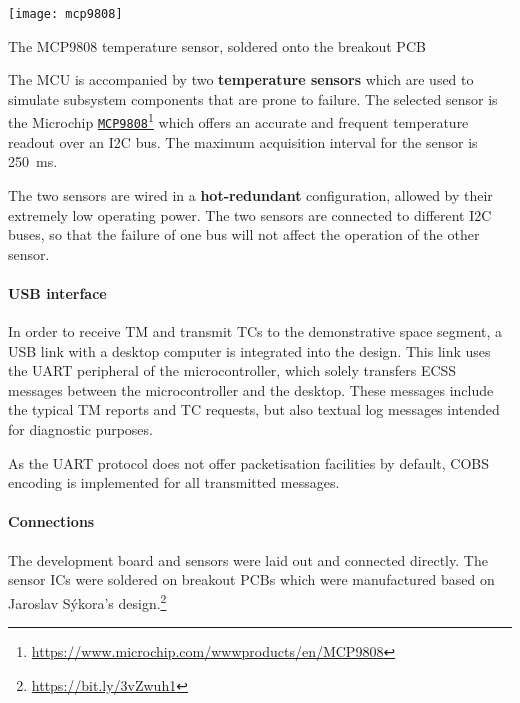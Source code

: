 \documentclass[a4paper,nobib]{tufte-book}
\begin{document}
\begin{marginfigure}
	      \texttt{[image: mcp9808]}
	      \caption{The MCP9808 temperature sensor, soldered onto the breakout \acs{PCB}}
\end{marginfigure}

The \ac{MCU} is accompanied by two \textbf{temperature sensors} which are used to simulate subsystem components that are prone to failure. The selected sensor is the Microchip \href{https://www.microchip.com/wwwproducts/en/MCP9808}{\texttt{MCP9808}}\footnote[][3ex]{\url{https://www.microchip.com/wwwproducts/en/MCP9808}} which offers an accurate and frequent temperature readout over an \ac{I2C} bus. The maximum acquisition interval for the sensor is \SI{250}{\milli\second}.


The two sensors are wired in a \textbf{hot-redundant} configuration, allowed by their extremely low operating power. The two sensors are connected to different \ac{I2C} buses, so that the failure of one bus will not affect the operation of the other sensor.

\paragraph{\acs{USB} interface} In order to receive \acl{TM} and transmit \aclp{TC} to the demonstrative space segment, a \acs{USB} link with a desktop computer is integrated into the design. This link uses the \acs{UART} peripheral of the microcontroller, which solely transfers \acs{ECSS} messages between the microcontroller and the desktop. These messages include the typical \acs{TM} reports and \acs{TC} requests, but also textual log messages intended for diagnostic purposes.

As the \acs{UART} protocol does not offer packetisation facilities by default, \ac{COBS} encoding \autocite{cheshire_consistent_overhead_1997} is implemented for all transmitted messages.

\paragraph{Connections}
The development board and sensors were laid out and connected directly. The sensor \acp{IC} were soldered on breakout \acp{PCB} which were manufactured based on Jaroslav Sýkora's design.\footnote[][-2ex]{\url{https://bit.ly/3vZwuh1}}
\end{document}
